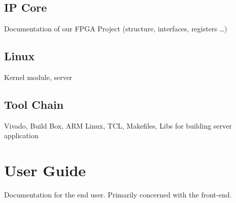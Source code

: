 \documentclass[a4paper,oneside]{alpenthesis/alpenthesis}
\begin{document}

\chapter{IP Core} %
\label{ch:IP_Core}
Documentation of our FPGA Project (structure, interfaces, registers \ldots)


\chapter{Linux} %
\label{ch:Linux}

Kernel module, server


\chapter{Tool Chain} %
\label{ch:Tool_Chain}
Vivado, Build Box, ARM Linux, TCL, Makefiles, Libs for building server application



\part{User Guide} %
\label{part:User_Guide}
Documentation  for the  end user. Primarily  concerned with  the 
front-end.


\cleardoublepage %
\begin{titlingpage*}
    \begin{vplace}
        \flushright\Huge\bfseries\sffamily\appendixpagename
    \end{vplace}
\end{titlingpage*}
\appendix
{}
\end{document}
